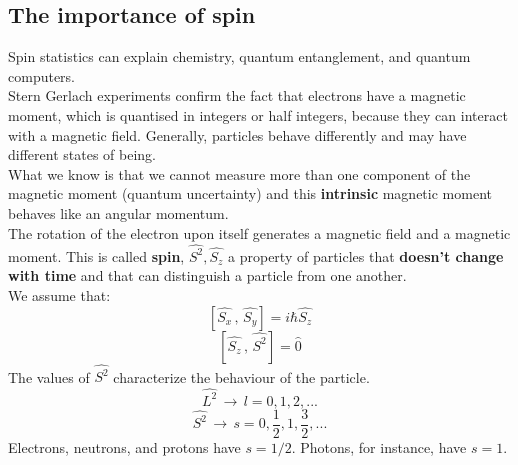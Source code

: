 \subsection{The importance of spin}
Spin statistics can explain chemistry, quantum entanglement, and quantum computers.\\
Stern Gerlach experiments confirm the fact that electrons have a magnetic moment, which is quantised in integers or half integers, because they can interact with a magnetic field. Generally, particles behave differently and may have different states of being.\\
What we know is that we cannot measure more than one component of the magnetic moment (quantum uncertainty) and this \textbf{intrinsic} magnetic moment behaves like an angular momentum.\\
The rotation of the electron upon itself generates a magnetic field and a magnetic moment. This is called \textbf{spin}, $\hat{S^2},\hat{S_z}$ a property of particles that \textbf{doesn't change with time} and that can distinguish a particle from one another.\\
\newline
We assume that:
\[ [\hat{S_x}\,,\,\hat{S_y}]=i\hbar\hat{S_z} \]
\[ [\hat{S_z}\,,\,\hat{S^2}]=\hat{0} \]
The values of $\hat{S^2}$ characterize the behaviour of the particle.\\
\[\hat{L^2}\,\rightarrow\,l=0, 1, 2, ...\]
\[\hat{S^2}\,\rightarrow\,s=0, \frac{1}{2}, 1, \frac{3}{2}, ...\]
Electrons, neutrons, and protons have $s=1/2$. Photons, for instance, have $s=1$.\\

